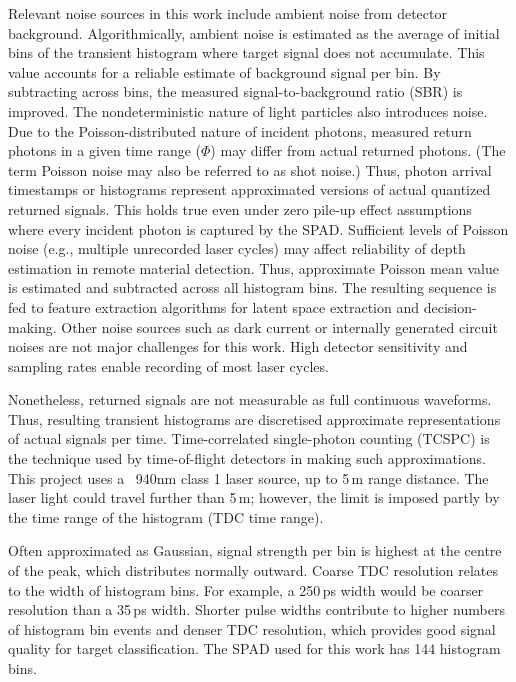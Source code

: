 \documentclass[12pt,a4paper,oneside]{report}
\begin{document}
Relevant noise sources in this work include ambient noise from detector background. Algorithmically, ambient noise is estimated as the average of initial bins of the transient histogram where target signal does not accumulate. This value accounts for a reliable estimate of background signal per bin. By subtracting across bins, the measured signal-to-background ratio (SBR) is improved. The nondeterministic nature of light particles also introduces noise. Due to the Poisson-distributed nature of incident photons, measured return photons in a given time range ($\Phi$) may differ from actual returned photons. (The term Poisson noise may also be referred to as shot noise.) Thus, photon arrival timestamps or histograms represent approximated versions of actual quantized returned signals. This holds true even under zero pile-up effect assumptions where every incident photon is captured by the SPAD. Sufficient levels of Poisson noise (e.g., multiple unrecorded laser cycles) may affect reliability of depth estimation in remote material detection. Thus, approximate Poisson mean value is estimated and subtracted across all histogram bins. The resulting sequence is fed to feature extraction algorithms for latent space extraction and decision-making. Other noise sources such as dark current or internally generated circuit noises are not major challenges for this work. High detector sensitivity and sampling rates enable recording of most laser cycles.

Nonetheless, returned signals are not measurable as full continuous waveforms. Thus, resulting transient histograms are discretised approximate representations of actual signals per time. Time-correlated single-photon counting (TCSPC) is the technique used by time-of-flight detectors in making such approximations. This project uses a ~940nm class 1 laser source, up to 5\,m range distance. The laser light could travel further than 5\,m; however, the limit is imposed partly by the time range of the histogram (TDC time range).

Often approximated as Gaussian, signal strength per bin is highest at the centre of the peak, which distributes normally outward. Coarse TDC resolution relates to the width of histogram bins. For example, a 250\,ps width would be coarser resolution than a 35\,ps width. Shorter pulse widths contribute to higher numbers of histogram bin events and denser TDC resolution, which provides good signal quality for target classification. The SPAD used for this work has 144 histogram bins.
\end{document}
